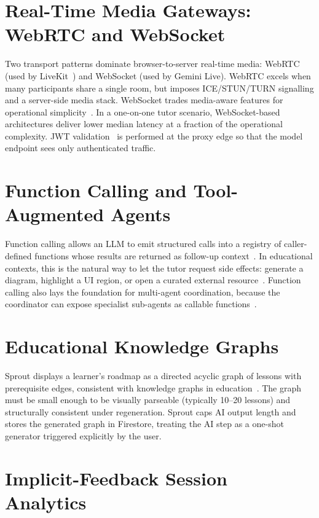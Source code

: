 \section{Real-Time Media Gateways: WebRTC and WebSocket}
\label{sec:lit-gateway}

Two transport patterns dominate browser-to-server real-time media: WebRTC (used by LiveKit~\cite{livekit2024}) and WebSocket (used by Gemini Live). WebRTC excels when many participants share a single room, but imposes ICE/STUN/TURN signalling and a server-side media stack. WebSocket trades media-aware features for operational simplicity~\cite{fette2011websocket}. In a one-on-one tutor scenario, WebSocket-based architectures deliver lower median latency at a fraction of the operational complexity. JWT validation~\cite{jones2015jwt} is performed at the proxy edge so that the model endpoint sees only authenticated traffic.

\section{Function Calling and Tool-Augmented Agents}
\label{sec:lit-function}

Function calling allows an LLM to emit structured calls into a registry of caller-defined functions whose results are returned as follow-up context~\cite{schick2023toolformer}. In educational contexts, this is the natural way to let the tutor request side effects: generate a diagram, highlight a UI region, or open a curated external resource~\cite{sprout2026function}. Function calling also lays the foundation for multi-agent coordination, because the coordinator can expose specialist sub-agents as callable functions~\cite{midscene2024}.

\section{Educational Knowledge Graphs}
\label{sec:lit-kg}

Sprout displays a learner's roadmap as a directed acyclic graph of lessons with prerequisite edges, consistent with knowledge graphs in education~\cite{chen2018knowedu}. The graph must be small enough to be visually parseable (typically 10--20 lessons) and structurally consistent under regeneration. Sprout caps AI output length and stores the generated graph in Firestore, treating the AI step as a one-shot generator triggered explicitly by the user.

\section{Implicit-Feedback Session Analytics}
\label{sec:lit-implicit}

